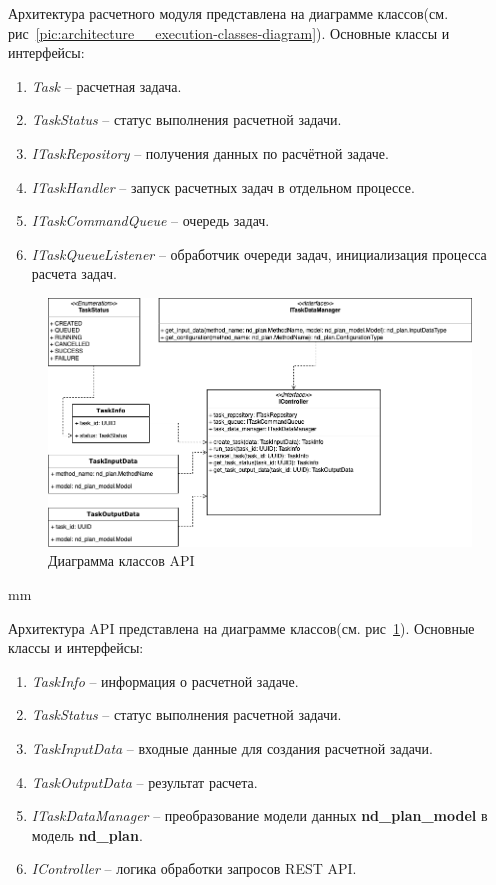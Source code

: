 Архитектура расчетного модуля представлена на диаграмме классов(см. рис\ \ref{pic:architecture__execution-classes-diagram}).
Основные классы и интерфейсы:
\begin{enumerate}
	\item \textit{Task} -- расчетная задача.
	\item \textit{TaskStatus} -- статус выполнения расчетной задачи.
	\item \textit{ITaskRepository} -- получения данных по расчётной задаче.
	\item \textit{ITaskHandler} -- запуск расчетных задач в отдельном процессе.
	\item \textit{ITaskCommandQueue} -- очередь задач.
	\item \textit{ITaskQueueListener} -- обработчик очереди задач, инициализация процесса расчета задач.
\end{enumerate}


\begin{figure}[H]
	\hspace*{-2.5 cm}\includegraphics[width=1.2\textwidth]{images/architecture/api_classes_diagram}
	\caption{Диаграмма классов API}
	\label{pic:architecture__api-classes-diagram}
\end{figure}
 mm

Архитектура API представлена на диаграмме классов(см. рис\ \ref{pic:architecture__api-classes-diagram}).
Основные классы и интерфейсы:
\begin{enumerate}
	\item \textit{TaskInfo} -- информация о расчетной задаче.
	\item \textit{TaskStatus} -- статус выполнения расчетной задачи.
	\item \textit{TaskInputData} -- входные данные для создания расчетной задачи.
	\item \textit{TaskOutputData} -- результат расчета.
	\item \textit{ITaskDataManager} -- преобразование модели данных \textbf{nd\_plan\_model} в модель \textbf{nd\_plan}.
	\item \textit{IController} -- логика обработки запросов REST API.
\end{enumerate}